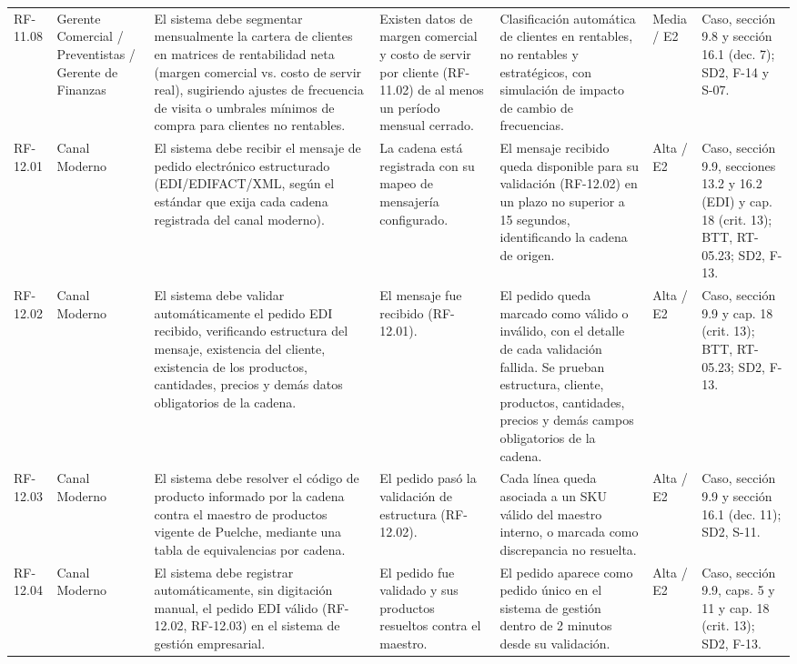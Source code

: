 {\begin{longtable}{@{}F{0.062} F{0.080} F{0.195} F{0.160} F{0.240} F{0.093} F{0.170}@{}}
  RF-11.08 & Gerente Comercial / Preventistas / Gerente de Finanzas & El sistema debe segmentar mensualmente la cartera de clientes en matrices de rentabilidad neta (margen comercial vs. costo de servir real), sugiriendo ajustes de frecuencia de visita o umbrales mínimos de compra para clientes no rentables. & Existen datos de margen comercial y costo de servir por cliente (RF-11.02) de al menos un período mensual cerrado. & Clasificación automática de clientes en rentables, no rentables y estratégicos, con simulación de impacto de cambio de frecuencias. & Media / E2 & Caso, sección 9.8 y sección 16.1 (dec. 7); SD2, F-14 y S-07. \\
  RF-12.01 & Canal Moderno & El sistema debe recibir el mensaje de pedido electrónico estructurado (EDI/EDIFACT/XML, según el estándar que exija cada cadena registrada del canal moderno). & La cadena está registrada con su mapeo de mensajería configurado. & El mensaje recibido queda disponible para su validación (RF-12.02) en un plazo no superior a 15 segundos, identificando la cadena de origen. & Alta / E2 & Caso, sección 9.9, secciones 13.2 y 16.2 (EDI) y cap. 18 (crit. 13); BTT, RT-05.23; SD2, F-13. \\
  RF-12.02 & Canal Moderno & El sistema debe validar automáticamente el pedido EDI recibido, verificando estructura del mensaje, existencia del cliente, existencia de los productos, cantidades, precios y demás datos obligatorios de la cadena. & El mensaje fue recibido (RF-12.01). & El pedido queda marcado como válido o inválido, con el detalle de cada validación fallida. Se prueban estructura, cliente, productos, cantidades, precios y demás campos obligatorios de la cadena. & Alta / E2 & Caso, sección 9.9 y cap. 18 (crit. 13); BTT, RT-05.23; SD2, F-13. \\
  RF-12.03 & Canal Moderno & El sistema debe resolver el código de producto informado por la cadena contra el maestro de productos vigente de Puelche, mediante una tabla de equivalencias por cadena. & El pedido pasó la validación de estructura (RF-12.02). & Cada línea queda asociada a un SKU válido del maestro interno, o marcada como discrepancia no resuelta. & Alta / E2 & Caso, sección 9.9 y sección 16.1 (dec. 11); SD2, S-11. \\
  RF-12.04 & Canal Moderno & El sistema debe registrar automáticamente, sin digitación manual, el pedido EDI válido (RF-12.02, RF-12.03) en el sistema de gestión empresarial. & El pedido fue validado y sus productos resueltos contra el maestro. & El pedido aparece como pedido único en el sistema de gestión dentro de 2 minutos desde su validación. & Alta / E2 & Caso, sección 9.9, caps. 5 y 11 y cap. 18 (crit. 13); SD2, F-13. \\

\end{longtable}}
